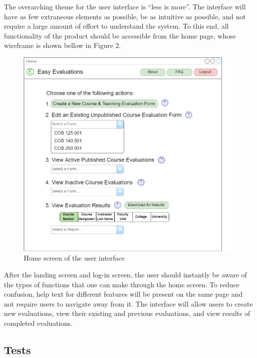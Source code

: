 \documentclass{article}
\begin{document}
The overarching theme for the user interface is ``less is more''.  The interface will have as few extraneous elements as possible, be as intuitive as possible, and not require a large amount of effort to understand the system.  To this end, all functionality of the product should be accessible from the home page, whose wireframe is shown bellow in Figure 2. 

\begin{center}
\begin{figure}[H]
    \centering
    \caption{Home screen of the user interface}
    \includegraphics[width=5.5in]{images/home_screen.png}
\end{figure}
\end{center}

After the landing screen and log-in screen, the user should instantly be aware of the types of functions that one can make through the home screen. To reduce confusion, help text for different features will be present on the same page and not require users to navigate away from it.  The interface will allow users to create new evaluations, view their existing and previous evaluations, and view results of completed evaluations.

\subsection{Tests}
\end{document}
